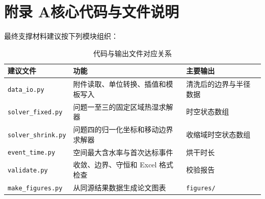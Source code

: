 \section*{附录 A\quad 核心代码与文件说明}

最终支撑材料建议按下列模块组织：

\begin{table}[H]
  \centering
  \caption{代码与输出文件对应关系}
  \begin{tabularx}{\textwidth}{p{}Xp{}}
    \toprule
    建议文件 & 功能 & 主要输出 \\
    \midrule
    \texttt{data\_io.py} & 附件读取、单位转换、插值和模板写入 & 清洗后的边界与半径数据 \\
    \texttt{solver\_fixed.py} & 问题一至三的固定区域热湿求解器 & 时空状态数组 \\
    \texttt{solver\_shrink.py} & 问题四的归一化坐标和移动边界求解器 & 收缩域时空状态数组 \\
    \texttt{event\_time.py} & 空间最大含水率与首次达标事件 & 烘干时长 \\
    \texttt{validate.py} & 收敛、边界、守恒和 Excel 格式检查 & 校验报告 \\
    \texttt{make\_figures.py} & 从同源结果数据生成论文图表 & \texttt{figures/} \\
    \bottomrule
  \end{tabularx}
\end{table}


% 

